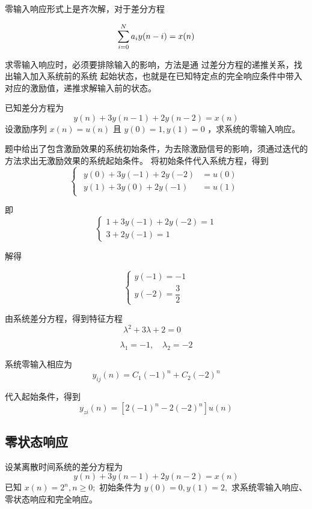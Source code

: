 \documentclass[cn,11pt,chinese,black,simple]{../elegantbook}
\begin{document}
零输入响应形式上是齐次解，对于差分方程

\[\displaystyle\sum_{i = 0}^N a_i y(n - i) = x(n)\] 

求零输入响应时，必须要排除输入的影响，方法是通
过差分方程的递推关系，找出输入加入系统前的系统
起始状态，也就是在已知特定点的完全响应条件中带入对应的激励值，递推求解输入前的状态。

\begin{example}
    已知差分方程为
\[
y(n)+3 y(n-1)+2 y(n-2)=x(n)
\]
设激励序列 \(x(n)=u(n)\) 且 \(y(0)=1, y(1)=0\) ，求系统的零输入响应。
\end{example}

\begin{solution}
题中给出了包含激励效果的系统初始条件，为去除激励信号的影响，须通过迭代的方法求出无激励效果的系统起始条件。
将初始条件代入系统方程，得到
\[
\left\{\begin{array}{l}
    \begin{aligned}
        y(0)+3 y(-1)+2 y(-2)&=u(0) \\
        y(1)+3 y(0)+2 y(-1)&=u(1)
    \end{aligned}
\end{array}\right.
\]

即
\[
\left\{\begin{array}{l}
1+3 y(-1)+2 y(-2)=1 \\
3+2 y(-1)=1
\end{array} \right.
\]

解得 

\[\left\{\begin{array}{l}
    y(-1)=-1 \\
    y(-2)=\dfrac{3}{2}
\end{array}\right.\]

由系统差分方程，得到特征方程
\[
\left.\lambda^{2}+3 \lambda+2=0 \quad\right. 
\]

\[ \lambda_{1}=-1, \quad \lambda_{2}=-2\]

系统零输入相应为
\[
y_{i j}(n)=C_{1}(-1)^{n}+C_{2}(-2)^{n}
\]

代入起始条件，得到
\[
y_{z i}(n)=\left[2(-1)^{n}-2(-2)^{n}\right] u(n)
\]

\end{solution}

\subsection{零状态响应}

\begin{example}
设某离散时间系统的差分方程为
\[
y(n)+3 y(n-1)+2 y(n-2)=x(n)
\]
已知 \(x(n)=2^{n}, n \geq 0 ;\) 初始条件为 \(y(0)=0, y(1)=2,\) 求系统零输入响应、零状态响应和完全响应。

\end{example}
\end{document}
